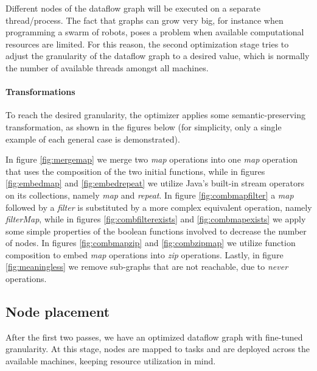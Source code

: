\documentclass[sigplan,review,anonymous]{acmart}
\begin{document}
Different nodes of the dataflow graph will be executed on a separate
thread/process. The fact that graphs can grow very big, for instance when
programming a swarm of robots, poses a problem when available
computational resources are limited. For this reason, the second optimization
stage tries to adjust the granularity of the dataflow graph to a desired value,
which is normally the number of available threads amongst all machines.

\paragraph{Transformations}
To reach the desired granularity, the optimizer applies some semantic-preserving
transformation, as shown in the figures below (for simplicity, only a single
example of each general case is demonstrated).


In figure \ref{fig:mergemap} we merge two \textit{map} operations into
one \textit{map} operation that uses the composition of the two initial
functions, while in figures \ref{fig:embedmap} and \ref{fig:embedrepeat} we
utilize Java's built-in stream operators on its collections, namely \textit{map}
and \textit{repeat}. In figure \ref{fig:combmapfilter} a \textit{map} followed
by a \textit{filter} is substituted by a more complex equivalent operation,
namely \textit{filterMap}, while in figures \ref{fig:combfilterexists} and
\ref{fig:combmapexists} we apply some simple properties of the boolean functions
involved to decrease the number of nodes. In figures \ref{fig:combmapzip} and
\ref{fig:combzipmap} we utilize function composition to embed \textit{map}
operations into \textit{zip} operations. Lastly, in figure \ref{fig:meaningless}
we remove sub-graphs that are not reachable, due to \textit{never} operations.

\subsection{Node placement}

After the first two passes, we have an optimized dataflow graph with fine-tuned
granularity. At this stage, nodes are mapped to tasks and are deployed across
the available machines, keeping resource utilization in mind.
\end{document}

